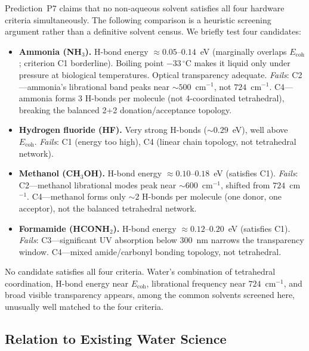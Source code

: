 \documentclass[12pt,a4paper]{article}
\theoremstyle{definition}
\theoremstyle{remark}
\begin{document}
Prediction~P7 claims that no non-aqueous solvent satisfies all four
hardware criteria simultaneously.  The following comparison is a
heuristic screening argument rather than a definitive solvent census.
We briefly test four candidates:

\begin{itemize}[nosep]
\item \textbf{Ammonia (NH$_3$).}
  H-bond energy $\approx 0.05$--$0.14$~eV (marginally overlaps
  $E_{\mathrm{coh}}$; criterion C1 borderline).  Boiling point
  $-33\,^\circ$C makes it liquid only under pressure at biological
  temperatures.  Optical transparency adequate.
  \textit{Fails}: C2---ammonia's librational band peaks near
  $\sim 500$~cm$^{-1}$, not $724$~cm$^{-1}$.
  C4---ammonia forms 3 H-bonds per molecule (not 4-coordinated
  tetrahedral), breaking the balanced 2+2 donation/acceptance topology.

\item \textbf{Hydrogen fluoride (HF).}
  Very strong H-bonds ($\sim 0.29$~eV), well above $E_{\mathrm{coh}}$.
  \textit{Fails}: C1 (energy too high), C4 (linear chain topology,
  not tetrahedral network).

\item \textbf{Methanol (CH$_3$OH).}
  H-bond energy $\approx 0.10$--$0.18$~eV (satisfies C1).
  \textit{Fails}: C2---methanol librational modes peak near
  $\sim 600$~cm$^{-1}$, shifted from $724$~cm$^{-1}$.
  C4---methanol forms only $\sim 2$ H-bonds per molecule (one donor,
  one acceptor), not the balanced tetrahedral network.

\item \textbf{Formamide (HCONH$_2$).}
  H-bond energy $\approx 0.12$--$0.20$~eV (satisfies C1).
  \textit{Fails}: C3---significant UV absorption below $300$~nm narrows
  the transparency window.
  C4---mixed amide/carbonyl bonding topology, not tetrahedral.
\end{itemize}

\noindent
No candidate satisfies all four criteria.  Water's combination of
tetrahedral coordination, H-bond energy near $E_{\mathrm{coh}}$,
librational frequency near $724$~cm$^{-1}$, and broad visible
transparency appears, among the common solvents screened here, unusually
well matched to the four criteria.

\subsection{Relation to Existing Water Science}
\end{document}
